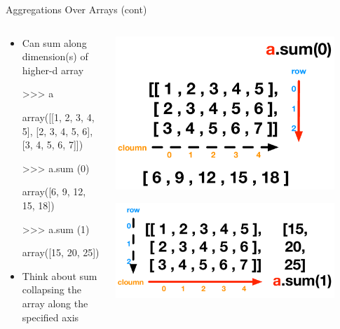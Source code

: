 \documentclass[aspectratio=169]{beamer}
\begin{document}

\begin{frame}[fragile]{Aggregations Over Arrays (cont)}

\begin{columns}

\begin{column}{0.5\textwidth}
\begin{itemize}
\item Can sum along dimension(s) of higher-d array 

\begin{SQL}
>>> a

array([[1, 2, 3, 4, 5],
       [2, 3, 4, 5, 6],
       [3, 4, 5, 6, 7]])

>>> a.sum (0)

array([6, 9, 12, 15, 18])

>>> a.sum (1)

array([15, 20, 25])
\end{SQL}
\item Think about sum collapsing the array along the specified axis
\end{itemize}
\end{column}

\begin{column}{0.5\textwidth}
	{\centering\includegraphics[width=0.9\textwidth]{./lectPython/Canvas07.pdf}\par}
	{\centering\includegraphics[width=0.9\textwidth]{./lectPython/Canvas08.pdf}\par}
	
\end{column}

\end{columns}
\end{frame}
\end{document}
